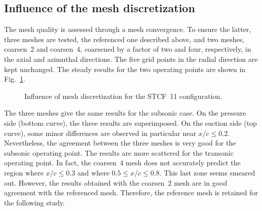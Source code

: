 \subsection{Influence of the mesh discretization}
\label{sub:stcf11_mesh_convergence}
The mesh quality is assessed through a mesh convergence.
To ensure the latter, three meshes are tested, the referenced one
described above, and two meshes, coarsen~2 and coarsen~4,
coarsened by a factor of two and four, respectively, in the axial and
azimuthal directions. The five grid points in the radial direction
are kept unchanged.
The steady results for the two operating points are shown 
in Fig.~\ref{fig:stcf11_mesh_convergence}.
\begin{figure}[htb!]
  \centering
  \caption{Influence of mesh discretization for the STCF~11 configuration.}
  \label{fig:stcf11_mesh_convergence}
\end{figure}
The three meshes give the same results for the subsonic case. On the
pressure side (bottom curve), the three results are superimposed. On the suction side
(top curve),
some minor differences are observed in particular near
$x / c \leq 0.2$. Nevertheless, the agreement
between the three meshes is very good for the subsonic operating point.
The results are more scattered for the transonic operating point. In fact,
the coarsen~4 mesh does not accurately predict the region where $x / c \leq 0.3$
and where $0.5 \leq x / c \leq 0.8$. This last zone seems smeared out. 
However, the results
obtained with the coarsen~2 mesh are in good agreement with the referenced mesh.
Therefore, the reference mesh is retained for the following study.

